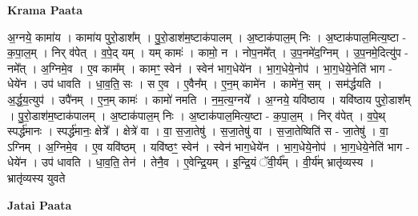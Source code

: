 \documentclass[17pt]{extarticle}
\begin{document}
\textbf{Krama Paata} \newline

अ॒ग्नये॒ कामा॑य । कामा॑य पुरो॒डाश᳚म् । पु॒रो॒डाश॑म॒ष्टाक॑पालम् । अ॒ष्टाक॑पाल॒म् निः । अ॒ष्टाक॑पाल॒मित्य॒ष्टा - क॒पा॒ल॒म् । निर् व॑पेत् । व॒पे॒द् यम् । यम् कामः॑ । कामो॒ न । नोप॒नमे᳚त् । उ॒प॒नमे॑द॒ग्निम् । उ॒प॒नमे॒दित्यु॑प - नमे᳚त् । अ॒ग्निमे॒व । ए॒व काम᳚म् । कामꣳ॒॒ स्वेन॑ । स्वेन॑ भाग॒धेये॑न । भा॒ग॒धेये॒नोप॑ । भा॒ग॒धेये॒नेति॑ भाग - धेये॑न । उप॑ धावति । धा॒व॒ति॒ सः । स ए॒व । ए॒वैन᳚म् । ए॒न॒म् कामे॑न । कामे॑न॒ सम् । सम॑र्द्धयति । अ॒र्द्ध॒य॒त्युप॑ । उपै॑नम् । ए॒न॒म् कामः॑ । कामो॑ नमति । न॒म॒त्य॒ग्नये᳚ । अ॒ग्नये॒ यवि॑ष्ठाय । यवि॑ष्ठाय पुरो॒डाश᳚म् । पु॒रो॒डाश॑म॒ष्टाक॑पालम् । अ॒ष्टाक॑पाल॒म् निः । अ॒ष्टाक॑पाल॒मित्य॒ष्टा - क॒पा॒ल॒म् । निर् व॑पेत् । व॒पे॒थ् स्पर्द्ध॑मानः । स्पर्द्ध॑मानः॒ क्षेत्रे᳚ । क्षेत्रे॑ वा । वा॒ स॒जा॒तेषु॑ । स॒जा॒तेषु॑ वा । स॒जा॒तेष्विति॑ स - जा॒तेषु॑ । वा॒ ऽग्निम् । अ॒ग्निमे॒व । ए॒व यवि॑ष्ठम् । यवि॑ष्ठꣳ॒॒ स्वेन॑ । स्वेन॑ भाग॒धेये॑न । भा॒ग॒धेये॒नोप॑ । भा॒ग॒धेये॒नेति॑ भाग - धेये॑न । उप॑ धावति । धा॒व॒ति॒ तेन॑ । तेनै॒व । ए॒वेन्द्रि॒यम् । इ॒न्द्रि॒यं ॅवी॒र्य᳚म् । वी॒र्य॑म् भ्रातृ॑व्यस्य । भ्रातृ॑व्यस्य युवते \newline

\textbf{Jatai Paata} \newline
\end{document}
